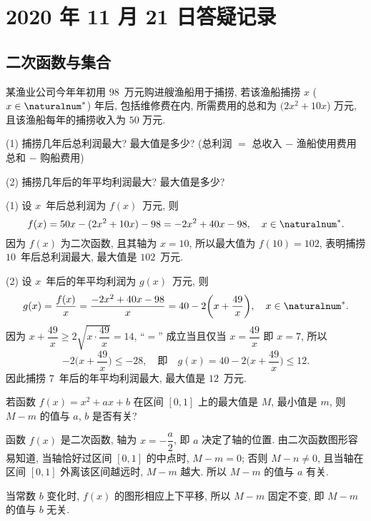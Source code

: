 \section{2020 年 11 月 21 日答疑记录}

\subsection{二次函数与集合}

\begin{example}
    某渔业公司今年年初用 $98$~万元购进艘渔船用于捕捞, 若该渔船捕捞 $x$ ($x\in \naturalnum^*$) 年后, 包括维修费在内, 所需费用的总和为 $(2x^2 +10x$) 万元, 且该渔船每年的捕捞收入为 $50$ 万元.
    
    (1) 捕捞几年后总利润最大? 最大值是多少? 
    (总利润 $=$ 总收入 $-$ 渔船使用费用总和 $-$ 购船费用)
    
    (2) 捕捞几年后的年平均利润最大? 最大值是多少?
\end{example}
\begin{solution}
    (1) 设 $x$~年后总利润为 $f(x)$~万元, 则
    \[f(x)=50x-(2x^2+10x)-98= -2x^2+40x-98,\quad x\in \naturalnum^*.\]
    因为 $f(x)$ 为二次函数, 且其轴为 $x=10$, 所以最大值为 $f(10)= 102$, 表明捕捞 $10$~年后总利润最大, 最大值是 $102$~万元.
    
    (2) 设 $x$~年后的年平均利润为 $g(x)$~万元, 则
    \[g(x)=\frac{f(x)}x= \frac{-2x^2+40x-98}x
        = 40- 2\biggl(x+\frac{49}x\biggr),\quad x\in \naturalnum^*.\]
    因为 $x+\dfrac{49}x\geqslant 2\sqrt{x\cdot\dfrac{49}x}= 14$, ``$=$'' 成立当且仅当 $x=\dfrac{49}x$ 即 $x=7$, 所以
    \[-2\biggl(x+\frac{49}x\biggr)\leqslant -28,\quad\text{即}\quad
        g(x)= 40- 2\biggl(x+\frac{49}x\biggr)\leqslant 12.\]
    因此捕捞 $7$~年后的年平均利润最大, 最大值是 $12$~万元.
\end{solution}

\begin{example}
    若函数 $f(x)= x^2+ax+b$ 在区间 $[0,1]$ 上的最大值是 $M$, 最小值是 $m$, 则 $M-m$ 的值与 $a$, $b$ 是否有关?
\end{example}
\begin{solution}
    函数 $f(x)$ 是二次函数, 轴为 $x=-\dfrac{a}2$, 即 $a$ 决定了轴的位置. 由二次函数图形容易知道, 当轴恰好过区间 $[0,1]$ 的中点时, $M-m=0$; 否则 $M-n\neq 0$, 且当轴在区间 $[0,1]$ 外离该区间越远时, $M-m$ 越大. 所以 $M-m$ 的值与 $a$ 有关.
    
    当常数 $b$ 变化时, $f(x)$ 的图形相应上下平移, 所以 $M-m$ 固定不变, 即 $M-m$ 的值与 $b$ 无关.
\end{solution}

